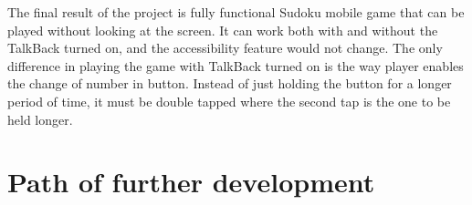 \documentclass[a4paper,twoside,12pt]{book}
\newcommand\tabularhead[2]{
\begin{table}%
  \caption{<<#1>> #2}
  \begin{tabular}{|p{0.4\linewidth}|p{0.55\linewidth}|}
    \hline
    \textbf{Action} & \textbf{#1} \\
    \hline}
\newcommand\addrow[2]{#1 &#2\\ \hline}
\newenvironment{usecase}{\tabularhead}
{\hline\end{tabular}\end{table}}
\begin{document}

\par The final result of the project is fully functional Sudoku mobile game that can be played without looking at the screen. It can work both with and without the TalkBack turned on, and the accessibility feature would not change. The only difference in playing the game with TalkBack turned on is the way player enables the change of number in button. Instead of just holding the button for a longer period of time, it must be double tapped where the second tap is the one to be held longer.

\section{Path of further development}
\end{document}
